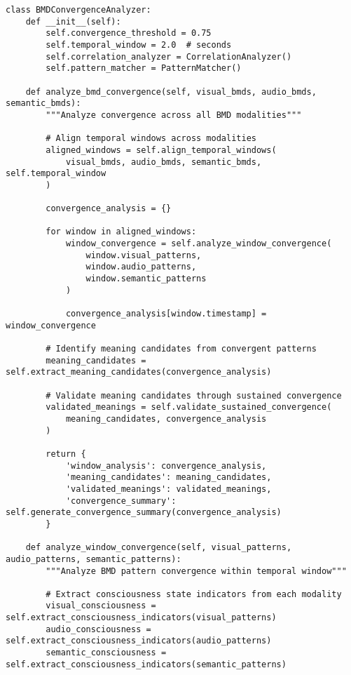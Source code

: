 \documentclass[12pt,a4paper]{article}
\begin{document}
\begin{lstlisting}[style=pythonstyle, caption=BMD Convergence Detection]
class BMDConvergenceAnalyzer:
    def __init__(self):
        self.convergence_threshold = 0.75
        self.temporal_window = 2.0  # seconds
        self.correlation_analyzer = CorrelationAnalyzer()
        self.pattern_matcher = PatternMatcher()
        
    def analyze_bmd_convergence(self, visual_bmds, audio_bmds, semantic_bmds):
        """Analyze convergence across all BMD modalities"""
        
        # Align temporal windows across modalities
        aligned_windows = self.align_temporal_windows(
            visual_bmds, audio_bmds, semantic_bmds, self.temporal_window
        )
        
        convergence_analysis = {}
        
        for window in aligned_windows:
            window_convergence = self.analyze_window_convergence(
                window.visual_patterns,
                window.audio_patterns, 
                window.semantic_patterns
            )
            
            convergence_analysis[window.timestamp] = window_convergence
        
        # Identify meaning candidates from convergent patterns
        meaning_candidates = self.extract_meaning_candidates(convergence_analysis)
        
        # Validate meaning candidates through sustained convergence
        validated_meanings = self.validate_sustained_convergence(
            meaning_candidates, convergence_analysis
        )
        
        return {
            'window_analysis': convergence_analysis,
            'meaning_candidates': meaning_candidates,
            'validated_meanings': validated_meanings,
            'convergence_summary': self.generate_convergence_summary(convergence_analysis)
        }
    
    def analyze_window_convergence(self, visual_patterns, audio_patterns, semantic_patterns):
        """Analyze BMD pattern convergence within temporal window"""
        
        # Extract consciousness state indicators from each modality
        visual_consciousness = self.extract_consciousness_indicators(visual_patterns)
        audio_consciousness = self.extract_consciousness_indicators(audio_patterns)
        semantic_consciousness = self.extract_consciousness_indicators(semantic_patterns)
        

\end{lstlisting}
\end{document}
